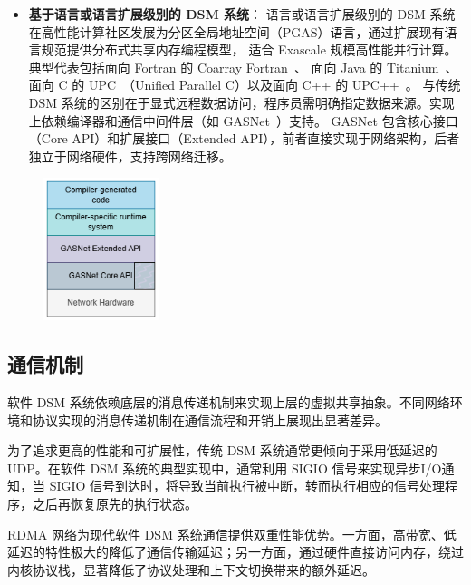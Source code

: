 {\begin{itemize}
        \item \textbf{基于语言或语言扩展级别的 DSM 系统}：
              语言或语言扩展级别的 DSM 系统在高性能计算社区发展为分区全局地址空间（PGAS）语言，通过扩展现有语言规范提供分布式共享内存编程模型，
              适合 Exascale 规模高性能并行计算。典型代表包括面向 Fortran 的 Coarray Fortran~\citep{numrich1998coarrayfortran, coarryfortran2}、
              面向 Java 的 Titanium~\citep{Yelick1998Titanium}、
              面向 C 的 UPC~\citep{bonachea2013UPC}（Unified Parallel C）以及面向 C++ 的 UPC++~\citep{bachan2019upc++}。
              与传统 DSM 系统的区别在于显式远程数据访问，程序员需明确指定数据来源。实现上依赖编译器和通信中间件层（如 GASNet~\citep{Bonachea2018GASNetEX}）支持。
              GASNet 包含核心接口（Core API）和扩展接口（Extended API），前者直接实现于网络架构，后者独立于网络硬件，支持跨网络迁移。
    \end{itemize}

    \begin{figure}
        \centering
        \includegraphics[width=0.3\textwidth]{Img/GASNet.png}
        \label{fig:GASNET}
    \end{figure}

    \subsection{通信机制}
    软件 DSM 系统依赖底层的消息传递机制来实现上层的虚拟共享抽象。不同网络环境和协议实现的消息传递机制在通信流程和开销上展现出显著差异。

    为了追求更高的性能和可扩展性，传统 DSM 系统通常更倾向于采用低延迟的 UDP。在软件 DSM 系统的典型实现中，通常利用 SIGIO 信号来实现异步I/O通知，当 SIGIO 信号到达时，将导致当前执行被中断，转而执行相应的信号处理程序，之后再恢复原先的执行状态。

    RDMA 网络为现代软件 DSM 系统通信提供双重性能优势。一方面，高带宽、低延迟的特性极大的降低了通信传输延迟；另一方面，通过硬件直接访问内存，绕过内核协议栈，显著降低了协议处理和上下文切换带来的额外延迟。

}
